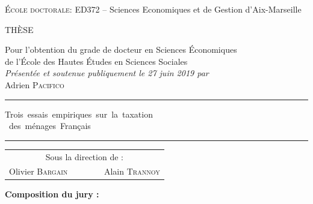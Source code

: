 \vspace{0.5cm}

\begin{center}
\normalsize \textsc{École doctorale:} ED372 --  Sciences Economiques et de Gestion d'Aix-Marseille 
\end{center}


\begin{center}
\large {\sc TH\`ESE\\} \small \vspace{0.1cm}

Pour l’obtention du grade de docteur en Sciences Économiques \\
de l’École des Hautes Études en Sciences Sociales\\\vspace{1cm}
\emph{Présentée et soutenue publiquement le 27 juin 2019 par}\\
\vspace{0.1cm}
\large
Adrien \textsc{Pacifico} \\
\normalsize \vspace{0.3cm}

\textcolor[RGB]{220,220,220}{\rule{0.5\linewidth}{1pt}}
\vspace{0.1cm}


\LARGE  {\sc Trois~essais~empiriques~sur~la~taxation\\} 
\LARGE {\sc ~des~ménages~Français \\}\normalsize 



\vspace{0.1cm}
\textcolor[RGB]{220,220,220}{\rule{0.5\linewidth}{1pt}}


\vspace{1cm}
\begin{tabular}{cc}
\multicolumn{2}{c}{Sous la direction de :} \\
Olivier \textsc{Bargain} ~~~ & ~~~Alain \textsc{Trannoy}
\end{tabular}



\vspace{0.85cm}
\bfseries Composition du jury \normalfont :\\


\end{center}



